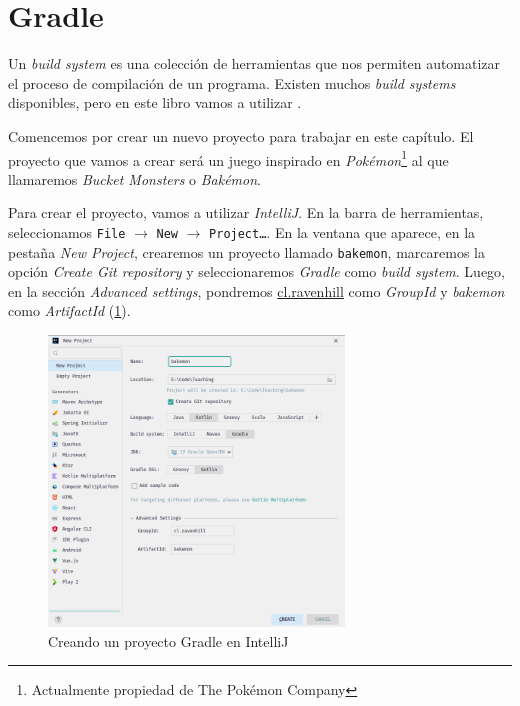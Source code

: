 
\section{Gradle}
  \label{subsec:gradle}
  Un \textit{build system} es una colección de herramientas que nos permiten
  automatizar el proceso de compilación de un programa.
  Existen muchos \textit{build systems} disponibles, pero en este libro vamos a utilizar
  .

  Comencemos por crear un nuevo proyecto para trabajar en este capítulo.
  El proyecto que vamos a crear será un juego inspirado en \textit{Pokémon}\footnote{
    Actualmente propiedad de The Pokémon Company
  } al que llamaremos \textit{Bucket Monsters} o \textit{Bakémon}.

  Para crear el proyecto, vamos a utilizar \textit{IntelliJ}.
  En la barra de herramientas, seleccionamos \texttt{File} $\rightarrow$ \texttt{New} $\rightarrow$
  \texttt{Project\dots}.
  En la ventana que aparece, en la pestaña \textit{New Project}, crearemos un proyecto llamado
  \texttt{bakemon}, marcaremos la opción \textit{Create Git repository} y seleccionaremos 
  \textit{Gradle} como \textit{build system}.
  Luego, en la sección \textit{Advanced settings}, pondremos \url{cl.ravenhill} como 
  \textit{GroupId} y \textit{bakemon} como \textit{ArtifactId} (\cref{fig:gradle-project}).

  \begin{figure}[ht!]
    \centering
    \includegraphics[width=0.7\textwidth]{img/oop/tdd/gradle/gradle-project.png}
    \caption{Creando un proyecto Gradle en IntelliJ}
    \label{fig:gradle-project}
  \end{figure}

